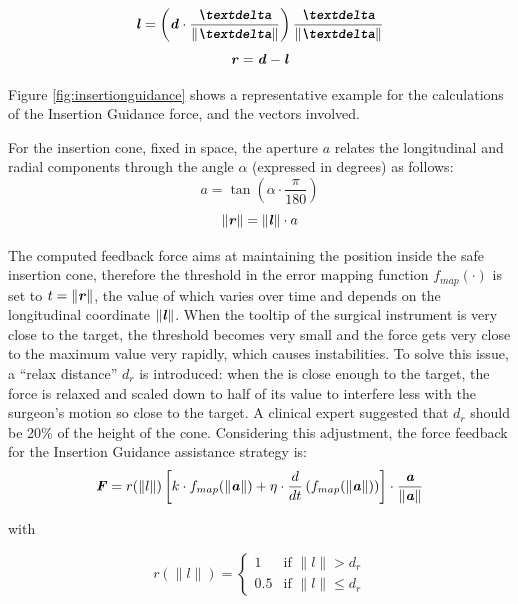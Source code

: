 \documentclass[../main.tex]{subfiles}
\begin{document}
\begin{equation}
    \vect{l} =  \left(\vect{d}\cdot \frac{\vect{\textdelta}}{\|\vect{\textdelta}\|} \right) \frac{\vect{\textdelta}}{\|\vect{\textdelta}\|}
\end{equation} 
\begin{equation}
    \textbf{\textit{r}} = \textbf{\textit{d}} - \textbf{\textit{l}}
\end{equation}

Figure \ref{fig:insertionguidance} shows a representative example for the calculations of the Insertion Guidance \vf force, and the vectors involved.

For the insertion cone, fixed in space, the aperture $a$ relates the longitudinal and radial components through the angle $\alpha$ (expressed in degrees) as follows:
\begin{equation}
    a = \tan\left(\alpha\cdot\frac{\pi}{180}\right)
\end{equation}
\begin{equation}
    \|\textbf{\textit{r}}\| = \|\textbf{\textit{l}}\|\cdot a
\end{equation}


The computed feedback force aims at maintaining the \ee position inside the safe insertion cone, therefore the threshold in the error mapping function $f_{map}(\cdot)$ is set to $t = \|\textbf{\textit{r}}\|$, the value of which varies over time and depends on the longitudinal coordinate $\|\textbf{\textit{l}}\|$. When the tooltip of the surgical instrument is very close to the target, the threshold becomes very small and the force gets very close to the maximum value very rapidly, which causes instabilities. To solve this issue, a ``relax distance'' $d_r$ is introduced: when the \ee is close enough to the target, the force is relaxed and scaled down to half of its value to interfere less with the surgeon's motion so close to the target. A clinical expert suggested that $d_r$ should be 20\% of the height of the cone. Considering this adjustment, the force feedback for the Insertion Guidance assistance strategy is:
\begin{equation}
    \textbf{\textit{F}} = r(\|l\|)\left[k\cdot f_{map}(\|\textbf{\textit{a}}\|) + \eta\cdot \frac{d}{dt} \left( f_{map}(\|\textbf{\textit{a}}\|)\right)\right]\cdot \frac{\textbf{\textit{a}}}{\|\textbf{\textit{a}}\|}
    \label{eq:insertionguidance}
\end{equation}

with

\begin{equation}
    r(\|l\|) = 
    \begin{cases}
        1 & \text{if } \|l\| > d_r \\
        0.5 & \text{if } \|l\| \leq d_r
    \end{cases}
\end{equation}
\end{document}
